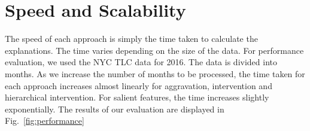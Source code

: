 




\section{Speed and Scalability}
\label{sec:speed}
The speed of each approach is simply the time taken to calculate the explanations. The time varies depending on the size of the data. For performance evaluation, we used the NYC TLC data for 2016. The data is divided into months. As we increase the number of months to be processed, the time taken for each approach increases almost linearly for aggravation, intervention and hierarchical intervention. For salient features, the time increases slightly exponentially. The results of our evaluation are displayed in Fig.~\ref{fig:performance}

